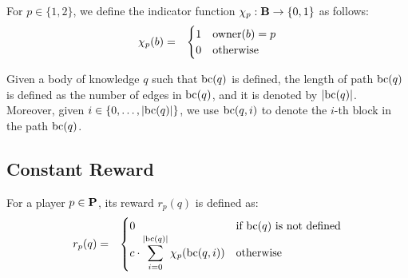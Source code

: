 \documentclass{article}
\begin{document}
For $p \in \{1,2\}$, we define the indicator  function $\chi_p : \mathbf{B} \to \{0,1\}$ as follows:
\begin{eqnarray*}
\chi_p(b) & = & 
\begin{cases}
1 & \text{owner}(b) = p\\
0 & \text{otherwise}
\end{cases}
\end{eqnarray*}

Given a body of knowledge $q$ such that $\text{bc}(q)$ is defined, the length of path $\text{bc}(q)$ is defined as the number of edges in $\text{bc}(q)$, and it is denoted by $|\text{bc}(q)|$. Moreover, given $i \in \{0, \ldots, |\text{bc}(q)|\}$, we use $\text{bc}(q,i)$ to denote the $i$-th block in the path $\text{bc}(q)$.


\subsection{Constant Reward}
For a player $p \in \mathbf{P}$, its reward $r_p(q)$ is defined as:
\begin{eqnarray*}
r_p(q) & = & 
\begin{cases}
0 & \text{if } \text{bc}(q) \text{ is not defined}\\
{\displaystyle c \cdot \sum_{i=0}^{|\text{bc}(q)|} \chi_p(\text{bc}(q,i))} & \text{otherwise}
\end{cases}
\end{eqnarray*}
\end{document}
